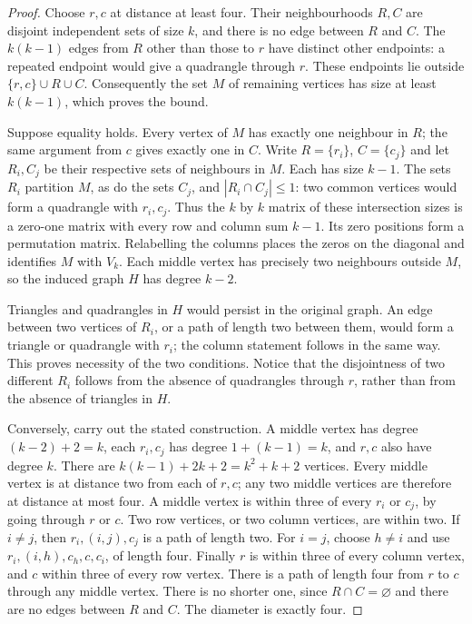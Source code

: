 \documentclass[11pt,a4paper]{article}
\begin{document}
\begin{proof}
Choose $r,c$ at distance at least four. Their neighbourhoods $R,C$
are disjoint independent sets of size $k$, and there is no edge
between $R$ and $C$. The $k(k-1)$ edges from $R$ other than those
to $r$ have distinct other endpoints: a repeated endpoint would
give a quadrangle through $r$. These endpoints lie outside
$\{r,c\}\cup R\cup C$. Consequently the set $M$ of remaining
vertices has size at least $k(k-1)$, which proves the bound.

Suppose equality holds. Every vertex of $M$ has exactly one neighbour
in $R$; the same argument from $c$ gives exactly one in $C$.
Write $R=\{r_i\}$, $C=\{c_j\}$ and let $R_i,C_j$ be their
respective sets of neighbours in $M$. Each has size $k-1$.
The sets $R_i$ partition $M$, as do the sets $C_j$, and
$|R_i\cap C_j|\leq1$: two common vertices would form a quadrangle
with $r_i,c_j$. Thus the $k$ by $k$ matrix of these intersection
sizes is a zero-one matrix with every row and column sum $k-1$.
Its zero positions form a permutation matrix. Relabelling the
columns places the zeros on the diagonal and identifies $M$ with
$V_k$. Each middle vertex has precisely two neighbours outside
$M$, so the induced graph $H$ has degree $k-2$.

Triangles and quadrangles in $H$ would persist in the original
graph. An edge between two vertices of $R_i$, or a path of length
two between them, would form a triangle or quadrangle with $r_i$;
the column statement follows in the same way. This proves necessity
of the two conditions. Notice that the disjointness of two different
$R_i$ follows from the absence of quadrangles through $r$, rather
than from the absence of triangles in $H$.

Conversely, carry out the stated construction. A middle vertex has
degree $(k-2)+2=k$, each $r_i,c_j$ has degree $1+(k-1)=k$, and
$r,c$ also have degree $k$. There are $k(k-1)+2k+2=k^2+k+2$
vertices. Every middle vertex is at distance two from each of $r,c$;
any two middle vertices are therefore at distance at most four.
A middle vertex is within three of every $r_i$ or $c_j$, by going
through $r$ or $c$. Two row vertices, or two column vertices, are
within two. If $i\ne j$, then $r_i,(i,j),c_j$ is a path of length
two. For $i=j$, choose $h\ne i$ and use
$r_i,(i,h),c_h,c,c_i$, of length four. Finally $r$ is within three
of every column vertex, and $c$ within three of every row vertex.
There is a path of length four from $r$ to $c$ through any middle
vertex. There is no shorter one, since $R\cap C=\varnothing$ and
there are no edges between $R$ and $C$. The diameter is exactly four.


\end{proof}
\end{document}

